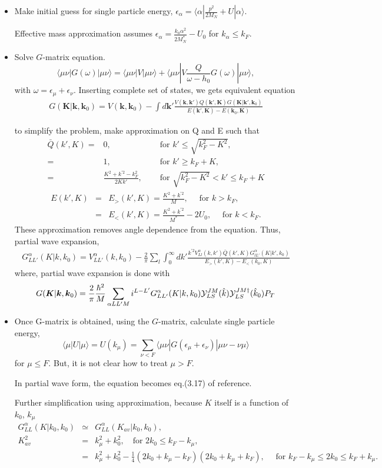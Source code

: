 \documentclass[10pt]{article}
\def\bm{\boldsymbol}
\newcommand{\bea}{\begin{eqnarray}}
\newcommand{\eea}{\end{eqnarray}}
\newcommand{\no}{\nonumber \\}
\def\vk{{\bm k}}
\def\la{\langle}
\def\ra{\rangle}
\begin{document}
\begin{itemize} 
\item Make initial guess for single particle energy,
 $\epsilon_\alpha=\la \alpha|\frac{p^2}{2M_N}+U|\alpha\ra $.
 
 Effective mass approximation assumes 
 $\epsilon_\alpha=\frac{k_a\alpha^2}{2M_N^*}-U_0$ for $k_\alpha\leq k_F$.
 
\item Solve $G$-matrix equation.
$$
\la \mu\nu|G(\omega)|\mu\nu\ra =\la \mu\nu|V|\mu\nu\ra +\la \mu\nu|V\frac{Q}{\omega-h_0}G(\omega)|\mu\nu\ra ,
$$
with $\omega = \epsilon_\mu+\epsilon_\nu$. Inserting complete set of states, we gets
equivalent equation
\bea 
G({\bm K}|\vk,\vk_0)=V(\vk,\vk_0)-\int {d\vk'} 
   \frac{ V(\vk,\vk')Q(\vk',{\bm K}) G({\bm K}|\vk',\vk_0)}
   {E(\vk',{\bm K})-E(\vk_0,{\bm K})}
\eea 

to simplify the problem, make approximation on Q and E such that
\bea 
\bar{Q}(k',K)=& 0, \quad &\mbox{ for } k'\leq \sqrt{k_F^2-K^2},\no 
             =& 1, \quad &\mbox{ for } k'\geq k_F+K,\no 
             =& \frac{K^2+k^{'2}-k_F^2}{2K k'},\quad &\mbox{ for } \sqrt{k_F^2-K^2}<k'\leq k_F+K
\eea 
\bea 
E(k',K)&=&E_{>}(k',K)= \frac{K^2+k^{'2}}{M}, \quad \mbox{ for } k> k_F,\no 
       &=&E_{<}(k',K)= \frac{K^2+k^{'2}}{M^*}-2U_0, \quad \mbox{ for } k<k_F.
\eea 
These approximation removes angle dependence from the equation. Thus,
partial wave expansion,
\bea 
G^\alpha_{LL'}(K|k,k_0)=V^\alpha_{LL'}(k,k_0)
                 -\frac{2}{\pi}\sum_{l} \int_0^\infty dk'
                 \frac{k^{'2} V_{Ll}^\alpha(k,k')  \bar{Q}(k',K) G^\alpha_{l L'}(K|k',k_0)}
                 {E_{>}(k',K)-E_{<}(k_0,K)}     
\eea 
where, partial wave expansion is done with
\bea 
G({\bm K}|\vk,\vk_0)=\frac{2}{\pi}\frac{\hbar^2}{M} \sum_{\alpha L L' M}
     i^{L-L'} G_{LL'}^\alpha(K|k,k_0) 
     {\cal Y}^{JM}_{LS}(\hat{k}){\cal Y}_{LS}^{JM\dagger}(\hat{k}_0) P_T
\eea 

\item Once G-matrix is obtained, 
      using the $G$-matrix,  calculate single particle energy,
$$\la \mu|U|\mu\ra =U(k_\mu)=\sum_{\nu<F}\la \mu\nu|G(\epsilon_\mu+\epsilon_\nu)|\mu\nu-\nu\mu\ra 
$$ for $\mu\leq F$. But, it is not clear how to treat $\mu>F$.

In partial wave form, the equation becomes eq.(3.17) of reference.

Further simplification using approximation, 
because $K$ itself is a function of $k_0$, $k_\mu$
\bea 
G^\alpha_{LL}(K|k_0,k_0)&\simeq& G^\alpha_{LL}(K_{av}|k_0,k_0),\no 
K_{av}^2 &=& k_\mu^2+k_0^2,\quad \mbox{for } 2k_0\leq k_F-k_\mu,\no 
         &=& k_\mu^2+k_0^2-\frac{1}{4}(2k_0+k_\mu-k_F)(2k_0+k_\mu+k_F),
         \quad \mbox{ for } k_F-k_\mu\leq 2k_0\leq k_F+k_\mu.
\eea 


\end{itemize}
\end{document}
